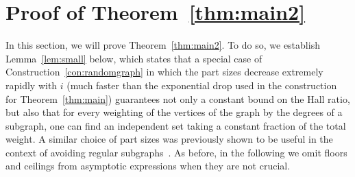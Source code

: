 \documentclass[a4paper,10pt]{amsart}
\begin{document}
\section{Proof of Theorem~\ref{thm:main2}}\label{sec:main2}

In this section, we will prove Theorem~\ref{thm:main2}. To do so, we establish Lemma~\ref{lem:small} below, which states that a special case of Construction~\ref{con:randomgraph} in which the part sizes decrease extremely rapidly with $i$ (much faster than the exponential drop used in the construction for Theorem~\ref{thm:main}) guarantees not only a constant bound on the Hall ratio, but also that for every weighting of the vertices of the graph by the degrees of a subgraph, one can find an independent set taking a constant fraction of the total weight. A similar choice of part sizes was previously shown to be useful in the context of avoiding regular subgraphs~\cite{janzer}. As before, in the following we omit floors and ceilings from asymptotic expressions when they are not crucial. 
\end{document}
